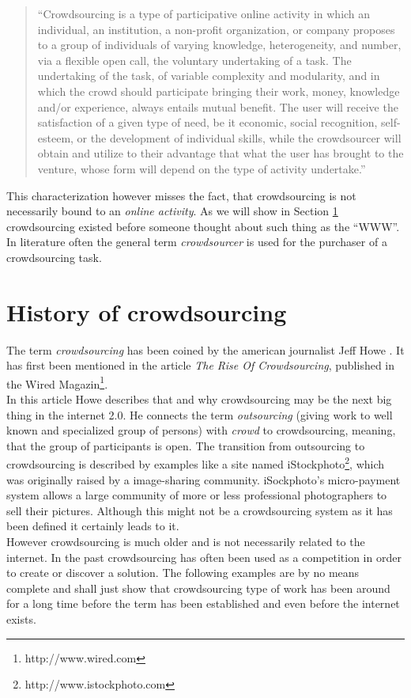 \documentclass{acm_proc_article-sp}
\begin{document}
  \begin{quote}
    ``Crowdsourcing is a type of participative online activity in which an individual, an institution, a non-profit organization, or company proposes to a group of individuals of varying knowledge, heterogeneity, and number, via a flexible open call, the voluntary undertaking of a task.  The undertaking of the task, of variable complexity and modularity, and in which the crowd should participate bringing their work, money, knowledge and/or experience, always entails mutual benefit. The user will receive the satisfaction of a given type of need, be it economic, social recognition, self-esteem, or the development of individual skills, while the crowdsourcer will obtain and utilize to their advantage that what the user has brought to the venture, whose form will depend on the type of activity undertake.''
  \end{quote}
  This characterization however misses the fact, that crowdsourcing is not necessarily bound to an \textit{online activity}. As we will show in Section \ref{sect:history} crowdsourcing existed before someone thought about such thing as the ``WWW''.\\
  In literature often the general term \textit{crowdsourcer} is used for the purchaser of a crowdsourcing task.

  \section{History of crowdsourcing}
  \label{sect:history}
  The term \textit{crowdsourcing} has been coined by the american journalist Jeff Howe \cite{howe:rise}. It has first been mentioned in the article \textit{The Rise Of Crowdsourcing}, published in the Wired Magazin\footnote{http://www.wired.com}. \\
  In this article Howe describes that and why crowdsourcing may be the next big thing in the internet 2.0. He connects the term \textit{outsourcing} (giving work to well known and specialized group of persons) with \textit{crowd} to crowdsourcing, meaning, that the group of participants is open. The transition from outsourcing to crowdsourcing is described by examples like a site named iStockphoto\footnote{http://www.istockphoto.com}, which was originally raised by a image-sharing community. iSockphoto's micro-payment system allows a large community of more or less professional photographers to sell their pictures. Although this might not be a crowdsourcing system as it has been defined it certainly leads to it.\\
  However crowdsourcing is much older and is not necessarily related to the internet. In the past crowdsourcing has often been used as a competition in order to create or discover a solution. The following examples are by no means complete and shall just show that crowdsourcing type of work has been around for a long time before the term has been established and even before the internet exists.
\end{document}
